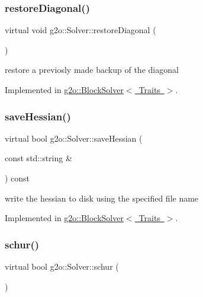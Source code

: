 \subsubsection{\texorpdfstring{restore\+Diagonal()}{restoreDiagonal()}}
{\footnotesize\ttfamily virtual void g2o\+::\+Solver\+::restore\+Diagonal (\begin{DoxyParamCaption}{ }\end{DoxyParamCaption})\hspace{0.3cm}{\ttfamily [pure virtual]}}

restore a previosly made backup of the diagonal 

Implemented in \mbox{\hyperlink{classg2o_1_1_block_solver_a2136931d7aa2f54df5207556c4685809}{g2o\+::\+Block\+Solver$<$ Traits $>$}}.

\mbox{\label{classg2o_1_1_solver_a14852543c4dc3f3e7088efe03aa135eb}} 
\subsubsection{\texorpdfstring{save\+Hessian()}{saveHessian()}}
{\footnotesize\ttfamily virtual bool g2o\+::\+Solver\+::save\+Hessian (\begin{DoxyParamCaption}\item[{const std\+::string \&}]{ }\end{DoxyParamCaption}) const\hspace{0.3cm}{\ttfamily [pure virtual]}}



write the hessian to disk using the specified file name 



Implemented in \mbox{\hyperlink{classg2o_1_1_block_solver_a51563178d31f3eae6ec61993ea069a77}{g2o\+::\+Block\+Solver$<$ Traits $>$}}.

\mbox{\label{classg2o_1_1_solver_acc8d6a8ae7847a157d4a2f44aea14c74}} 
\subsubsection{\texorpdfstring{schur()}{schur()}}
{\footnotesize\ttfamily virtual bool g2o\+::\+Solver\+::schur (\begin{DoxyParamCaption}{ }\end{DoxyParamCaption})\hspace{0.3cm}{\ttfamily [pure virtual]}}



